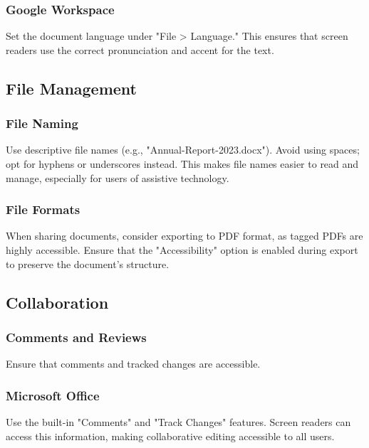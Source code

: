 \subsubsection{Google Workspace}\label{ch15:sssec:google-doc-properties}
Set the document language under "File > Language." This ensures that screen readers use the correct pronunciation and accent for the text.

\subsection{File Management}\label{ch15:ssec:file-management}

\subsubsection{File Naming}\label{ch15:sssec:file-naming}
Use descriptive file names (e.g., "Annual-Report-2023.docx"). Avoid using spaces; opt for hyphens or underscores instead. This makes file names easier to read and manage, especially for users of assistive technology.

\subsubsection{File Formats}\label{ch15:sssec:file-formats}
When sharing documents, consider exporting to PDF format, as tagged PDFs are highly accessible. Ensure that the "Accessibility" option is enabled during export to preserve the document's structure.

\subsection{Collaboration}\label{ch15:ssec:collaboration}

\subsubsection{Comments and Reviews}\label{ch15:sssec:comments-reviews}
Ensure that comments and tracked changes are accessible.

\subsubsection{Microsoft Office}\label{ch15:sssec:office-comments}
Use the built-in "Comments" and "Track Changes" features. Screen readers can access this information, making collaborative editing accessible to all users.

